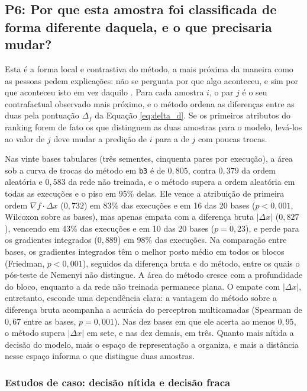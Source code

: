 \subsection{P6: Por que esta amostra foi classificada de forma diferente daquela, e o que precisaria mudar?}\label{subsec:res_diferencas}

Esta é a forma local e contrastiva do método, a mais próxima da maneira como as pessoas pedem explicações: não se pergunta por que algo aconteceu, e sim por que aconteceu isto em vez daquilo \citep{Miller2019}. Para cada amostra $i$, o par $j$ é o seu contrafactual observado mais próximo, e o método ordena as diferenças entre as duas pela pontuação $\Delta_f$ da Equação \eqref{eq:delta_d}. Se os primeiros atributos do ranking forem de fato os que distinguem as duas amostras para o modelo, levá-los ao valor de $j$ deve mudar a predição de $i$ para a de $j$ com poucas trocas.

Nas vinte bases tabulares (três sementes, cinquenta pares por execução), a área sob a curva de trocas do método em \texttt{b3} é de $0{,}805$, contra $0{,}379$ da ordem aleatória e $0{,}583$ da rede não treinada, e o método supera a ordem aleatória em todas as execuções e o piso em 95\% delas. Ele vence a atribuição de primeira ordem $\nabla f \cdot \Delta x$ ($0{,}732$) em 83\% das execuções e em 16 das 20 bases ($p < 0{,}001$, Wilcoxon sobre as bases), mas apenas empata com a diferença bruta $|\Delta x|$ ($0{,}827$), vencendo em 43\% das execuções e em 10 das 20 bases ($p = 0{,}23$), e perde para os gradientes integrados ($0{,}889$) em 98\% das execuções. Na comparação entre bases, os gradientes integrados têm o melhor posto médio em todos os blocos (Friedman, $p < 0{,}001$), seguidos da diferença bruta e do método, entre os quais o pós-teste de Nemenyi não distingue. A área do método cresce com a profundidade do bloco, enquanto a da rede não treinada permanece plana. O empate com $|\Delta x|$, entretanto, esconde uma dependência clara: a vantagem do método sobre a diferença bruta acompanha a acurácia do perceptron multicamadas (Spearman de $0{,}67$ entre as bases, $p = 0{,}001$). Nas dez bases em que ele acerta ao menos $0{,}95$, o método supera $|\Delta x|$ em sete, e nas dez demais, em três. Quanto mais nítida a decisão do modelo, mais o espaço de representação a organiza, e mais a distância nesse espaço informa o que distingue duas amostras.

\subsubsection*{Estudos de caso: decisão nítida e decisão fraca}

